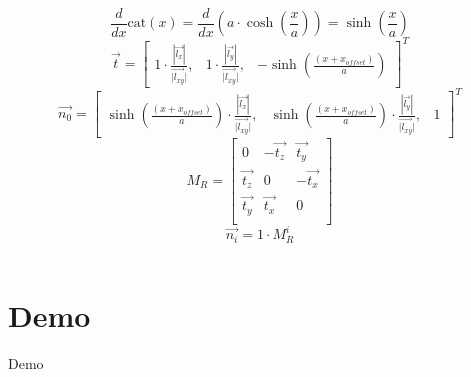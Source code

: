 \documentclass[aspectratio=169]{beamer}
\begin{document}
\begin{frame}[allowframebreaks]
\begin{columns}
		\begin{column}{0.5\textwidth}
				\begin{equation*}
				\frac{d}{dx} \text{cat}(x) = \frac{d}{dx} \left( a\cdot \cosh\left( \frac{x}{a} \right) \right) = \sinh\left( \frac{x}{a} \right)
			\end{equation*}
			\begin{equation*}
				\vec{t} =
				\begin{bmatrix}
					1 \cdot \frac{|\vec{l_x}|}{\vec{|l_{xy}}|}, &
					1 \cdot \frac{|\vec{l_y}|}{\vec{|l_{xy}}|}, &
					-\sinh(\frac{(x+x_{offset})}{a})
				\end{bmatrix}^T
			\end{equation*}
			\begin{equation*}
			\vec{n_0} =
			\begin{bmatrix}
				\sinh(\frac{(x+x_{offset})}{a}) \cdot \frac{|\vec{l_x}|}{\vec{|l_{xy}}|}, &
				\sinh(\frac{(x+x_{offset})}{a}) \cdot \frac{|\vec{l_y}|}{\vec{|l_{xy}}|}, &
				1
			\end{bmatrix}^T
			\end{equation*}
			\begin{equation*}
				M_R = 
				\begin{bmatrix}
					0 & -\vec{t_z} & \vec{t_y} \\
					\vec{t_z} & 0 & -\vec{t_x} \\
					\vec{t_y} & \vec{t_x} & 0 \\
				\end{bmatrix}
			\end{equation*}
			\begin{equation*}
				\vec{n_i} = 1 \cdot M_R^i
			\end{equation*}
		\end{column}
	\end{columns}
	\framebreak
	
\end{frame}

\section{Demo}

\begin{frame}
	  \begin{center}
	\Huge Demo
	\end{center}
\end{frame}
\end{document}
